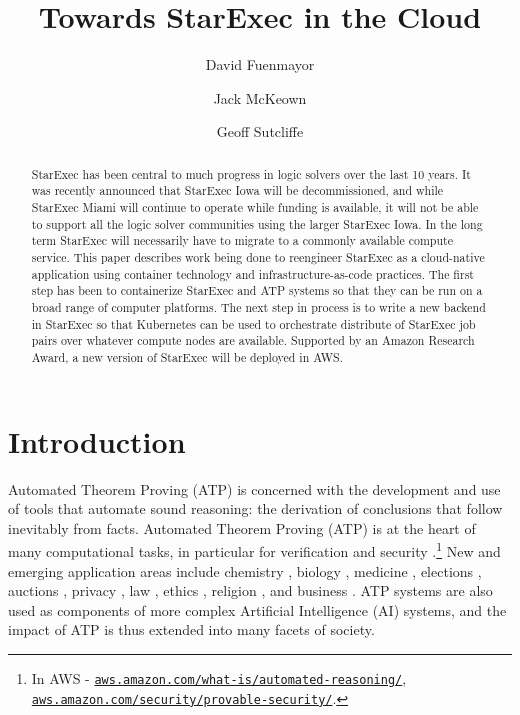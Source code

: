 \documentclass{easychair}
\title{Towards StarExec in the Cloud}
\author{
  David Fuenmayor\inst{1}
\and
  Jack McKeown\inst{2}
\and
  Geoff Sutcliffe\inst{2}
}
\institute{
  University of Bamberg,
  Bamberg, Germany\\
  \email{david.fuenmayor@uni-bamberg.de}
\and
  University of Miami,
  Miami, USA\\
  \email{jam771@miami.edu,geoff@cs.miami.edu}
}
\begin{document}
\maketitle

\begin{abstract}
StarExec has been central to much progress in logic solvers over the last 10 years.
It was recently announced that StarExec Iowa will be decommissioned, and while StarExec Miami 
will continue to operate while funding is available, it will not be able to support all the 
logic solver communities using the larger StarExec Iowa. 
In the long term StarExec will necessarily have to migrate to a commonly available compute 
service. 
This paper describes work being done to reengineer StarExec as a cloud-native application using
container technology and infrastructure-as-code practices.
The first step has been to containerize StarExec and ATP systems so that they can be run on a 
broad range of computer platforms. 
The next step in process is to write a new backend in StarExec so that Kubernetes can be used to 
orchestrate distribute of StarExec job pairs over whatever compute nodes are available.
Supported by an Amazon Research Award, a new version of StarExec will be deployed in AWS.
\end{abstract}
\section{Introduction}
\label{Introduction}

Automated Theorem Proving (ATP) is concerned with the development and use of tools that automate 
sound reasoning: the derivation of conclusions that follow inevitably from facts.
Automated Theorem Proving (ATP) is at the heart of many computational tasks, in particular for
verification \cite{Har06,HH19} and security \cite{Coo18}.\footnote{%
In AWS -
\href{https://aws.amazon.com/what-is/automated-reasoning/}{\tt aws.amazon.com/what-is/automated-reasoning/}, 
\href{https://aws.amazon.com/security/provable-security//}{\tt aws.amazon.com/security/provable-security/}.} 
New and emerging application areas include
chemistry \cite{Yad17}, 
biology \cite{CC+13}, 
medicine \cite{HLB05},
elections \cite{Nip09,BDS17}, 
auctions \cite{CK+15}, 
privacy \cite{Lib20},
law \cite{PS15}, 
ethics \cite{DF+16}, 
religion \cite{OZ11,BW14-ECAI,Hor19},
and business \cite{Han98}.
ATP systems are also used as components of more complex Artificial Intelligence (AI) systems,
and the impact of ATP is thus extended into many facets of society.
\end{document}
